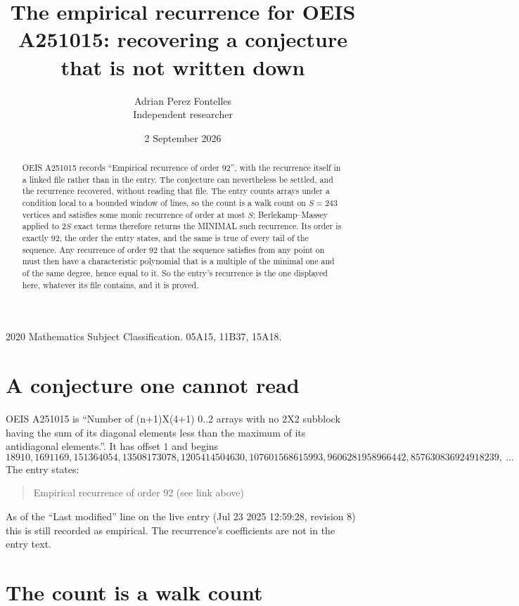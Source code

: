 \documentclass[11pt,a4paper]{article}
\title{The empirical recurrence for OEIS A251015: recovering a conjecture that is not written down}
\author{Adrian Perez Fontelles\\ \small Independent researcher}
\date{2 September 2026}
\theoremstyle{plain}
\theoremstyle{definition}
\begin{document}
\maketitle

\begin{abstract}
OEIS A251015 records ``Empirical recurrence of order $92$'', with the recurrence itself in a
linked file rather than in the entry. The conjecture can nevertheless be settled, and the
recurrence recovered, without reading that file. The entry counts arrays under a condition
local to a bounded window of lines, so the count is a walk count on $S=243$ vertices and
satisfies some monic recurrence of order at most $S$; Berlekamp--Massey applied to $2S$ exact
terms therefore returns the MINIMAL such recurrence. Its order is exactly $92$, the order
the entry states, and the same is true of every tail of the sequence. Any recurrence of order
$92$ that the sequence satisfies from any point on must then have a characteristic
polynomial that is a multiple of the minimal one and of the same degree, hence equal to it. So
the entry's recurrence is the one displayed here, whatever its file contains, and it is
proved.
\end{abstract}

\noindent\small 2020 Mathematics Subject Classification. 05A15, 11B37, 15A18.\normalsize

\section{A conjecture one cannot read}

OEIS A251015 is ``Number of (n+1)X(4+1) 0..2 arrays with no 2X2 subblock having the sum of its diagonal elements less than the maximum of its antidiagonal elements.''. It has offset $1$ and begins
\[
18910, 1691169, 151364054, 13508173078, 1205414504630, 107601568615993, 9606281958966442, 857630836924918239,\ \dots
\]
The entry states:
\begin{quote}
Empirical recurrence of order 92 (see link above)
\end{quote}
As of the ``Last modified'' line on the live entry (Jul 23 2025 12:59:28, revision 8) this is still
recorded as empirical. The recurrence's coefficients are not in the entry text.

\section{The count is a walk count}
\end{document}
